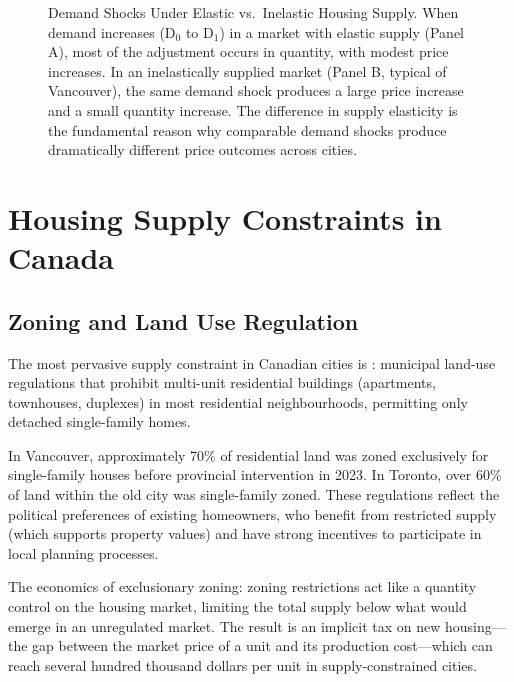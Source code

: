 \begin{figure}[H]
\caption{Demand Shocks Under Elastic vs.\ Inelastic Housing Supply. When demand increases
  (D$_0$ to D$_1$) in a market with elastic supply (Panel A), most of the adjustment occurs
  in quantity, with modest price increases. In an inelastically supplied market (Panel B,
  typical of Vancouver), the same demand shock produces a large price increase and a
  small quantity increase. The difference in supply elasticity is the fundamental reason
  why comparable demand shocks produce dramatically different price outcomes across cities.}
\label{fig:housing_sd}
\end{figure}

\section{Housing Supply Constraints in Canada}

\subsection{Zoning and Land Use Regulation}

The most pervasive supply constraint in Canadian cities is : municipal land-use regulations that prohibit multi-unit residential buildings (apartments, townhouses, duplexes) in most residential neighbourhoods, permitting only detached single-family homes.

In Vancouver, approximately 70\% of residential land was zoned exclusively for single-family houses before provincial intervention in 2023. In Toronto, over 60\% of land within the old city was single-family zoned. These regulations reflect the political preferences of existing homeowners, who benefit from restricted supply (which supports property values) and have strong incentives to participate in local planning processes.

The economics of exclusionary zoning: zoning restrictions act like a quantity control on the housing market, limiting the total supply below what would emerge in an unregulated market. The result is an implicit tax on new housing---the gap between the market price of a unit and its production cost---which can reach several hundred thousand dollars per unit in supply-constrained cities.

